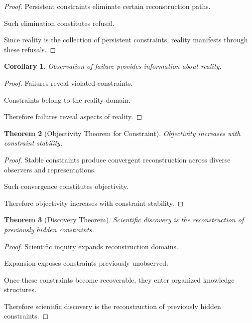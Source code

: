 \documentclass[12pt,oneside]{article}
\newtheorem{theorem}{Theorem}[section] \newtheorem{lemma}[theorem]{Lemma} \newtheorem{proposition}[theorem]{Proposition} \newtheorem{corollary}[theorem]{Corollary}
\theoremstyle{definition}
\begin{document}
\begin{proof}

Persistent constraints eliminate certain reconstruction paths.

Such elimination constitutes refusal.

Since reality is the collection of persistent constraints, reality manifests through these refusals.

\end{proof}

\begin{corollary}

Observation of failure provides information about reality.

\end{corollary}

\begin{proof}

Failures reveal violated constraints.

Constraints belong to the reality domain.

Therefore failures reveal aspects of reality.

\end{proof}

\begin{theorem}[Objectivity Theorem for Constraint]

Objectivity increases with constraint stability.

\end{theorem}

\begin{proof}

Stable constraints produce convergent reconstruction across diverse observers and representations.

Such convergence constitutes objectivity.

Therefore objectivity increases with constraint stability.

\end{proof}

\begin{theorem}[Discovery Theorem]

Scientific discovery is the reconstruction of previously hidden constraints.

\end{theorem}

\begin{proof}

Scientific inquiry expands reconstruction domains.

Expansion exposes constraints previously unobserved.

Once these constraints become recoverable, they enter organized knowledge structures.

Therefore scientific discovery is the reconstruction of previously hidden constraints.

\end{proof}
\end{document}
